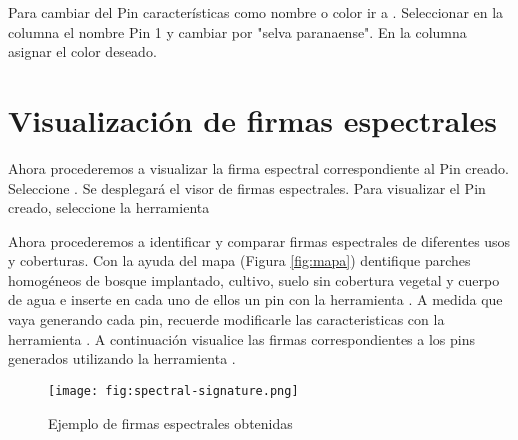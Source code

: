 Para cambiar del Pin características como nombre o color ir a  . Seleccionar en la columna  el nombre Pin 1 y cambiar por "selva paranaense". En la columna  asignar el color deseado.

\section{Visualización de firmas espectrales}

Ahora procederemos a visualizar la firma espectral correspondiente al Pin creado. Seleccione . Se desplegará el visor de firmas espectrales. Para visualizar el Pin creado, seleccione la herramienta 


Ahora procederemos a identificar y comparar firmas espectrales de diferentes usos y coberturas. Con la ayuda del mapa (Figura \ref{fig:mapa}) dentifique parches homogéneos de bosque implantado, cultivo, suelo sin cobertura vegetal y cuerpo de agua e inserte en cada uno de ellos un pin con la herramienta . A medida que vaya generando cada pin, recuerde modificarle las caracteristicas con la herramienta  . A continuación visualice las firmas correspondientes a los pins generados utilizando la herramienta .

\begin{figure}[h!]
    \centering
    \texttt{[image: fig:spectral-signature.png]}
    \caption{Ejemplo de firmas espectrales obtenidas}
    \label{fig:spectral-signature}
\end{figure}

